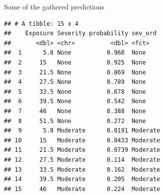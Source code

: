 \documentclass[
  ignorenonframetext,
]{beamer}
\newenvironment{Shaded}{\begin{snugshade}}{\end{snugshade}}
\newcommand{\DecValTok}[1]{\textcolor[rgb]{0.00,0.00,0.81}{#1}}
\newcommand{\KeywordTok}[1]{\textcolor[rgb]{0.13,0.29,0.53}{\textbf{#1}}}
\newcommand{\NormalTok}[1]{#1}
\newcommand{\OperatorTok}[1]{\textcolor[rgb]{0.81,0.36,0.00}{\textbf{#1}}}
\newcommand{\StringTok}[1]{\textcolor[rgb]{0.31,0.60,0.02}{#1}}
\begin{document}
\begin{frame}[fragile]{Some of the gathered predictions}
\protect\hypertarget{some-of-the-gathered-predictions}{}

\footnotesize

\begin{Shaded}
\end{Shaded}

\begin{verbatim}
## # A tibble: 15 x 4
##    Exposure Severity probability sev_ord 
##       <dbl> <chr>          <dbl> <fct>   
##  1      5.8 None          0.968  None    
##  2     15   None          0.925  None    
##  3     21.5 None          0.869  None    
##  4     27.5 None          0.789  None    
##  5     33.5 None          0.678  None    
##  6     39.5 None          0.542  None    
##  7     46   None          0.388  None    
##  8     51.5 None          0.272  None    
##  9      5.8 Moderate      0.0191 Moderate
## 10     15   Moderate      0.0433 Moderate
## 11     21.5 Moderate      0.0739 Moderate
## 12     27.5 Moderate      0.114  Moderate
## 13     33.5 Moderate      0.162  Moderate
## 14     39.5 Moderate      0.205  Moderate
## 15     46   Moderate      0.224  Moderate
\end{verbatim}

\normalsize

\end{frame}
\end{document}
